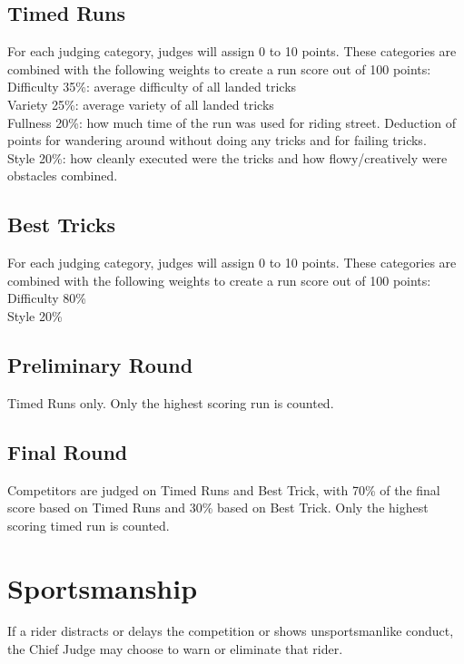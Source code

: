 \subsection{Timed Runs}
For each judging category, judges will assign 0 to 10 points.
These categories are combined with the following weights to create a run score out of 100 points:\\
Difficulty 35\%: average difficulty of all landed tricks\\
Variety 25\%: average variety of all landed tricks\\
Fullness 20\%: how much time of the run was used for riding street.
Deduction of points for wandering around without doing any tricks and for failing tricks.\\
Style 20\%: how cleanly executed were the tricks and how flowy/creatively were obstacles combined.

\subsection{Best Tricks}
For each judging category, judges will assign 0 to 10 points. These categories are combined with the following weights to create a run score out of 100 points:\\
Difficulty 80\% \\
Style 20\% \\

\subsection{Preliminary Round}
Timed Runs only.
Only the highest scoring run is counted.

\subsection{Final Round}
Competitors are judged on Timed Runs and Best Trick, with 70\% of the final score based on Timed Runs and 30\% based on Best Trick.
Only the highest scoring timed run is counted.

\section{Sportsmanship}
If a rider distracts or delays the competition or shows unsportsmanlike conduct, the Chief Judge may choose to warn or eliminate that rider.
